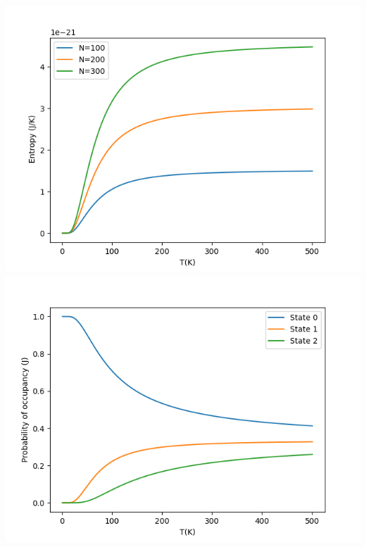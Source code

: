 \documentclass{article}
\begin{document}
	\includegraphics[width=15 cm]{MB_3.png}
	\includegraphics[width=15 cm]{MB_4.png}
	
	\inputminted{python}{prac_3_BE.py}
	
\end{document}
